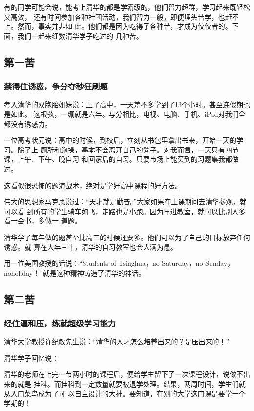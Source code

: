 \documentclass[11pt]{ctexart}
\begin{document}
{{{{有的同学可能会说，能考上清华的都是学霸级的，他们智力超群，学习起来既轻松又高效，
还有时间参加各种社团活动，我们智力一般，即便埋头苦学，也赶不上。然而，事实并非如
此。他们都是因为吃得了各种苦，才成为佼佼者的。下面，我们一起来细数清华学子吃过的
几种苦。

\subsection{第一苦}
\label{sec:orgb2db15e}

\subsubsection{禁得住诱惑，争分夺秒狂刷题}
\label{sec:orgb35c885}

考入清华的双胞胎姐妹说：上了高中，一天差不多学到了13个小时。甚至连假期也是如此。
这根弦，一绷就是六年。与分相比，电视、电脑、手机、iPad对我们全都没有诱惑力。

一位高考状元说：高中的时候，到校后，立刻从书包里拿出书来，开始一天的学习。除了上
厕所和跑操，基本不会离开自己的凳子。对我而言，一天只有四节课，上午、下午、晚自习
和回家后的自习。只要市场上能买到的习题集我都做过。

这看似很恐怖的题海战术，绝对是学好高中课程的好方法。

伟大的思想家马克思说过：“天才就是勤奋。”大家如果在上课期间去清华参观，就可以看
到所有的学生骑车如飞，走路也是小跑。因为早进教室，就可以比别人多看一会书，多做一
道题。

清华学子每年做的题甚至比高三的时候还要多。他们可以为了自己的目标放弃任何诱惑。就
算在大年三十，清华的自习教室也会人满为患。

用一位美国教授的话说：“Students of Tsinghua，no Saturday，no Sunday，
noholiday！”就是这种精神铸造了清华的神话。

\subsection{第二苦}
\label{sec:org861dc65}

\subsubsection{经住逼和压，练就超级学习能力}
\label{sec:org2d9baa3}

清华大学教授许纪敏先生说：“清华的人才怎么培养出来的？是压出来的！”

清华学子回忆说：

清华的老师在上完一节两小时的课程后，便给学生留下了一次课程设计，说做不出来的就是
挂科。而挂科到一定数量就要被退学处理。结果，两周时间，学生们就从入门菜鸟成为了可
以自主设计的大神。要知道，在别的大学这门课是要学一个学期的！

}}}}
\end{document}
